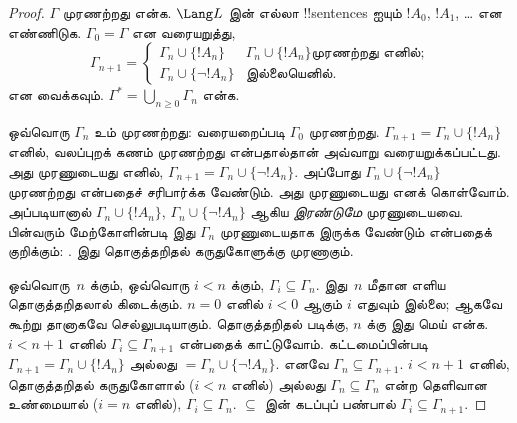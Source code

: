 \documentclass[../../../include/open-logic-section]{subfiles}
\begin{document}
\begin{proof}
$\Gamma$ முரணற்றது என்க. $\Lang L$ இன் எல்லா !!{sentence}s ஐயும்
$!A_0$, $!A_1$, \dots{} என எண்ணிடுக. $\Gamma_0 = \Gamma$ என வரையறுத்து,
\[
\Gamma_{n+1} =
\begin{cases}
\Gamma_n \cup \{ !A_n \} & \textrm{$\Gamma_n \cup \{!A_n\}$
  முரணற்றது எனில்;} \\
\Gamma_n \cup \{ \lnot !A_n \} & \textrm{இல்லையெனில்.}
\end{cases}
\]
என வைக்கவும். $\Gamma^* = \bigcup_{n \geq 0} \Gamma_n$ என்க.

ஒவ்வொரு $\Gamma_n$ உம் முரணற்றது: வரையறைப்படி $\Gamma_0$ முரணற்றது.
$\Gamma_{n+1} = \Gamma_n \cup \{!A_n\}$ எனில், வலப்புறக் கணம் முரணற்றது
என்பதால்தான் அவ்வாறு வரையறுக்கப்பட்டது. அது முரணுடையது எனில்,
$\Gamma_{n+1} = \Gamma_n \cup \{\lnot !A_n\}$. அப்போது
$\Gamma_n \cup \{\lnot !A_n\}$ முரணற்றது என்பதைச் சரிபார்க்க வேண்டும்.
அது முரணுடையது எனக் கொள்வோம். அப்படியானால் $\Gamma_n \cup \{!A_n\}$,
$\Gamma_n \cup \{\lnot !A_n\}$ ஆகிய \emph{இரண்டுமே} முரணுடையவை. பின்வரும்
மேற்கோளின்படி இது $\Gamma_n$ முரணுடையதாக இருக்க வேண்டும் என்பதைக் குறிக்கும்:
.
இது தொகுத்தறிதல் கருதுகோளுக்கு முரணாகும்.

ஒவ்வொரு~$n$ க்கும், ஒவ்வொரு $i < n$ க்கும்,
$\Gamma_i \subseteq \Gamma_n$. இது~$n$ மீதான எளிய தொகுத்தறிதலால் கிடைக்கும்.
$n=0$ எனில் $i < 0$ ஆகும் $i$ எதுவும் இல்லை; ஆகவே கூற்று தானாகவே
செல்லுபடியாகும். தொகுத்தறிதல் படிக்கு, $n$ க்கு இது மெய் என்க. $i < n+1$
எனில் $\Gamma_i \subseteq \Gamma_{n+1}$ என்பதைக் காட்டுவோம். கட்டமைப்பின்படி
$\Gamma_{n+1} = \Gamma_n \cup \{!A_n\}$ அல்லது
$= \Gamma_n \cup \{\lnot !A_n\}$. எனவே
$\Gamma_n \subseteq \Gamma_{n+1}$. $i < n+1$ எனில், தொகுத்தறிதல்
கருதுகோளால் ($i < n$ எனில்) அல்லது $\Gamma_n \subseteq \Gamma_n$ என்ற
தெளிவான உண்மையால் ($i = n$ எனில்), $\Gamma_i \subseteq \Gamma_n$.
$\subseteq$ இன் கடப்புப் பண்பால் $\Gamma_i \subseteq \Gamma_{n+1}$.


\end{proof}
\end{document}
